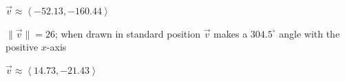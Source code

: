 \documentclass{ximera}
\begin{document}
\begin{question}
\begin{problem}
\begin{solution}
$\overrightarrow{v} \approx \left<-52.13, -160.44\right>$
\end{solution}
\end{problem}

\begin{problem} \label{vectorcompcalclast}
$\| \overrightarrow{v}\| = 26$; when drawn in standard position $\overrightarrow{v}$ makes a $304.5^{\circ}$ angle with the positive $x$-axis

\begin{solution}
$\overrightarrow{v} \approx \left<14.73, -21.43\right>$
\end{solution}
\end{problem}

\end{question}
\end{document}
